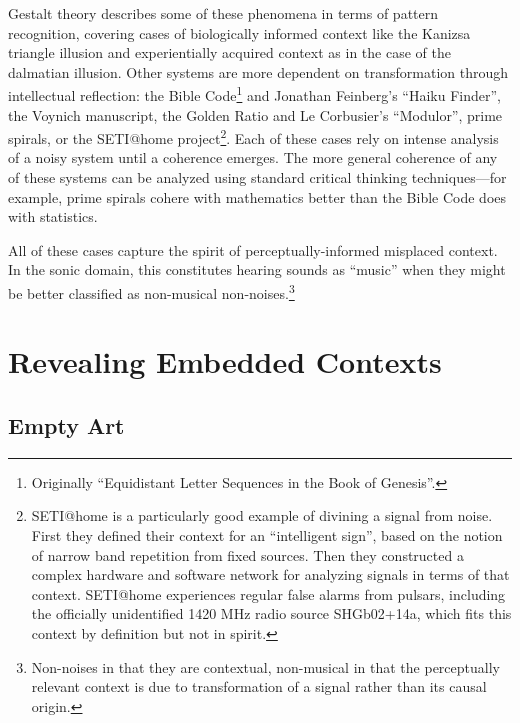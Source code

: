 \documentclass{thesis}
\begin{document}
Gestalt theory describes some of these phenomena in terms of pattern recognition, covering cases of biologically informed context like the Kanizsa triangle illusion\cite{alexander_bogomolny_kanizsa_????} and experientially acquired context as in the case of the dalmatian illusion\cite{michael_bach_dalmatian_2002}. Other systems are more dependent on transformation through intellectual reflection: the Bible Code\footnote{Originally ``Equidistant Letter Sequences in the Book of Genesis''\cite{rips_equidistant_1994}.} and Jonathan Feinberg's ``Haiku Finder'', the Voynich manuscript\cite{robin_mckie_secret_2004}, the Golden Ratio\cite{Doczi81}\cite{markowsky_misconceptions_1992} and Le Corbusier's ``Modulor''\cite{padovan_proportion_1999}, prime spirals\cite{michael_m._ross_natural_2007}\cite{weisstein_prime_????}, or the SETI@home project\cite{seti_about_????}\footnote{SETI@home is a particularly good example of divining a signal from noise. First they defined their context for an ``intelligent sign'', based on the notion of narrow band repetition from fixed sources. Then they constructed a complex hardware and software network for analyzing signals in terms of that context. SETI@home experiences regular false alarms from pulsars, including the officially unidentified 1420 MHz radio source SHGb02+14a\cite{eugenie_samuel_reich_mysterious_2004}, which fits this context by definition but not in spirit.}. Each of these cases rely on intense analysis of a noisy system until a coherence emerges. The more general coherence of any of these systems can be analyzed using standard critical thinking techniques\cite{Moore07}---for example, prime spirals cohere with mathematics better than the Bible Code does with statistics.

All of these cases capture the spirit of perceptually-informed misplaced context. In the sonic domain, this constitutes hearing sounds as ``music'' when they might be better classified as non-musical non-noises.\footnote{Non-noises in that they are contextual, non-musical in that the perceptually relevant context is due to transformation of a signal rather than its causal origin.}

\chapter{Revealing Embedded Contexts}

\section{Empty Art}
\end{document}
